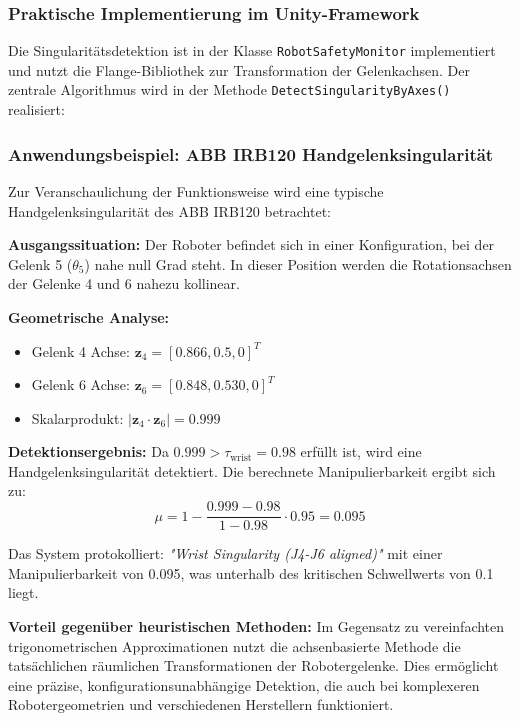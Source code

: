 \subsubsection{Praktische Implementierung im Unity-Framework}
\label{sssec:Unity_Implementierung}

Die Singularitätsdetektion ist in der Klasse \texttt{RobotSafetyMonitor}
implementiert und nutzt die Flange-Bibliothek zur Transformation der
Gelenkachsen. Der zentrale Algorithmus wird in der Methode
\texttt{DetectSingularityByAxes()} realisiert:

\subsubsection{Anwendungsbeispiel: ABB IRB120 Handgelenksingularität}
\label{sssec:Beispiel_IRB120}

Zur Veranschaulichung der Funktionsweise wird eine typische
Handgelenksingularität des ABB IRB120 betrachtet:

\textbf{Ausgangssituation:} Der Roboter befindet sich in einer Konfiguration, bei der Gelenk 5 ($\theta_5$) nahe null Grad steht. In dieser Position werden die Rotationsachsen der Gelenke 4 und 6 nahezu kollinear.

\textbf{Geometrische Analyse:}
\begin{itemize}
    \item Gelenk 4 Achse: $\mathbf{z}_4 = [0.866, 0.5, 0]^T$
    \item Gelenk 6 Achse: $\mathbf{z}_6 = [0.848, 0.530, 0]^T$
    \item Skalarprodukt: $|\mathbf{z}_4 \cdot \mathbf{z}_6| = 0.999$
\end{itemize}

\textbf{Detektionsergebnis:}
Da $0.999 > \tau_{\text{wrist}} = 0.98$ erfüllt ist, wird eine Handgelenksingularität detektiert. Die berechnete Manipulierbarkeit ergibt sich zu:
\begin{equation}
    \mu = 1 - \frac{0.999 - 0.98}{1 - 0.98} \cdot 0.95 = 0.095
\end{equation}

Das System protokolliert: \textit{"Wrist Singularity (J4-J6 aligned)"} mit
einer Manipulierbarkeit von 0.095, was unterhalb des kritischen Schwellwerts
von 0.1 liegt.

\textbf{Vorteil gegenüber heuristischen Methoden:}
Im Gegensatz zu vereinfachten trigonometrischen Approximationen nutzt die achsenbasierte Methode die tatsächlichen räumlichen Transformationen der Robotergelenke. Dies ermöglicht eine präzise, konfigurationsunabhängige Detektion, die auch bei komplexeren Robotergeometrien und verschiedenen Herstellern funktioniert.

